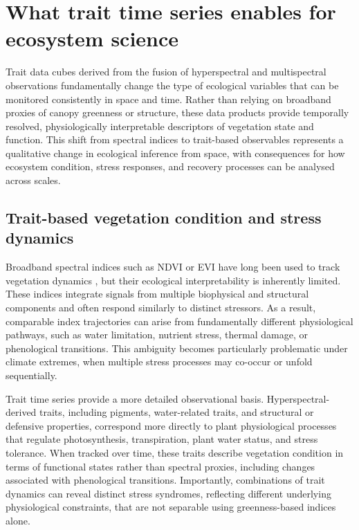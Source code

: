 \documentclass[pdflatex,sn-mathphys-num]{sn-jnl}%
\theoremstyle{thmstyleone}%
\theoremstyle{thmstyletwo}%
\theoremstyle{thmstylethree}%
\begin{document}
\section{What trait time series enables for ecosystem science} \label{sec3}

Trait data cubes derived from the fusion of hyperspectral and multispectral observations fundamentally change the type of ecological variables that can be monitored consistently in space and time. Rather than relying on broadband proxies of canopy greenness or structure, these data products provide temporally resolved, physiologically interpretable descriptors of vegetation state and function. This shift from spectral indices to trait-based observables represents a qualitative change in ecological inference from space, with consequences for how ecosystem condition, stress responses, and recovery processes can be analysed across scales.

\subsection{Trait-based vegetation condition and stress dynamics}

Broadband spectral indices such as NDVI or EVI have long been used to track vegetation dynamics \cite{zeng2022optical}, but their ecological interpretability is inherently limited. These indices integrate signals from multiple biophysical and structural components and often respond similarly to distinct stressors. As a result, comparable index trajectories can arise from fundamentally different physiological pathways, such as water limitation, nutrient stress, thermal damage, or phenological transitions. This ambiguity becomes particularly problematic under climate extremes, when multiple stress processes may co-occur or unfold sequentially.

Trait time series provide a more detailed observational basis. Hyperspectral-derived traits, including pigments, water-related traits, and structural or defensive properties, correspond more directly to plant physiological processes that regulate photosynthesis, transpiration, plant water status, and stress tolerance. When tracked over time, these traits describe vegetation condition in terms of functional states rather than spectral proxies, including changes associated with phenological transitions. Importantly, combinations of trait dynamics can reveal distinct stress syndromes, reflecting different underlying physiological constraints, that are not separable using greenness-based indices alone.
\end{document}
